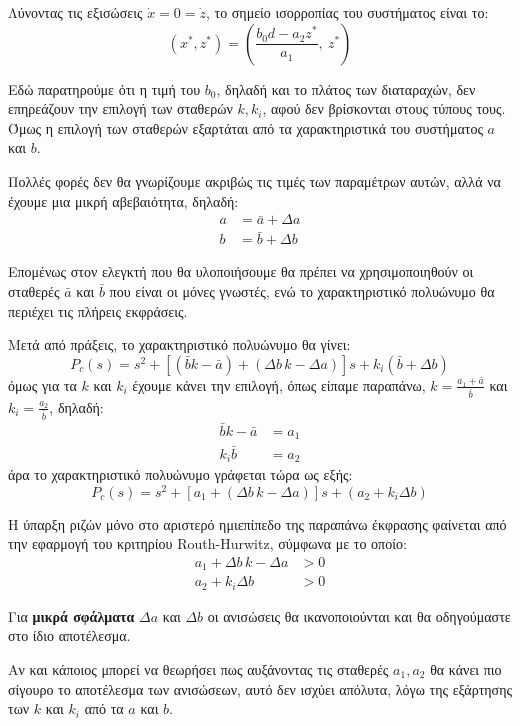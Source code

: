 \documentclass[11pt,a4paper,notitlepage,fleqn]{article}
\begin{document}
\begin{exercise}
	Λύνοντας τις εξισώσεις \( \dot x = 0 = \dot z \), το σημείο
	ισορροπίας του συστήματος είναι το:
	\[
	(x^*,z^*) = \left(
	\frac{b_0 d - a_2z^*}{a_1},\ z^*
	\right)
	\]
	
	
	Εδώ παρατηρούμε ότι η τιμή του \( b_0 \), δηλαδή και το πλάτος των
	διαταραχών, δεν επηρεάζουν την επιλογή των σταθερών \( k,k_i \),
	αφού δεν βρίσκονται στους τύπους τους. Όμως η επιλογή των σταθερών
	εξαρτάται από τα χαρακτηριστικά του συστήματος \( a \) και \( b \).
	
	Πολλές φορές δεν θα γνωρίζουμε ακριβώς τις τιμές των παραμέτρων
	αυτών, αλλά να έχουμε μια μικρή αβεβαιότητα, δηλαδή:
	\begin{align*}
		a &= \bar a + Δa \\
		b &= \bar b + Δb
	\end{align*}
	
	Επομένως στον ελεγκτή που θα
	υλοποιήσουμε θα πρέπει να χρησιμοποιηθούν οι σταθερές
	\( \bar a \) και \( \bar b \) που είναι οι μόνες γνωστές, ενώ το
	χαρακτηριστικό πολυώνυμο θα περιέχει τις πλήρεις εκφράσεις.
	
	Μετά από πράξεις, το χαρακτηριστικό πολυώνυμο θα γίνει:
	\[
	P_c(s) = s^2 + \left[
	(\bar b k - \bar a) + (Δb\,k - Δa)
	\right]s + k_i(\bar b + Δb)
	\]
	όμως για τα \( k \) και \( k_i \) έχουμε κάνει την επιλογή,
	όπως είπαμε παραπάνω, \( k=\frac{a_1+\bar a}{\bar b} \) και
	\( k_i = \frac{a_2}{\bar b} \), δηλαδή:
	\begin{align*}
		\bar b k - \bar a &= a_1\\
		k_i \bar b &= a_2
	\end{align*}
	άρα το χαρακτηριστικό πολυώνυμο γράφεται τώρα ως εξής:
	\[
	P_c(s) = s^2 + \left[
	a_1 + (Δb\,k-Δa)
	\right]s + (a_2 + k_iΔb)
	\]
	
	Η ύπαρξη ριζών μόνο στο αριστερό ημιεπίπεδο της παραπάνω έκφρασης
	φαίνεται από την εφαρμογή του κριτηρίου Routh-Hurwitz, σύμφωνα
	με το οποίο:
	\begin{align*}
		a_1 + Δb\, k - Δa &> 0 \\
		a_2 + k_iΔb &>0
	\end{align*}
	
	Για \textbf{μικρά σφάλματα}
	\( Δa \) και \( Δb \) οι ανισώσεις θα ικανοποιούνται
	και θα οδηγούμαστε στο ίδιο αποτέλεσμα.
	
	Αν και κάποιος μπορεί να θεωρήσει πως αυξάνοντας τις σταθερές
	\( a_1,a_2 \) θα κάνει πιο σίγουρο το αποτέλεσμα των ανισώσεων,
	αυτό δεν ισχύει απόλυτα, λόγω της εξάρτησης των \( k \) και
	\( k_i \) από τα \( a \) και \( b \).
\end{exercise}
\end{document}
